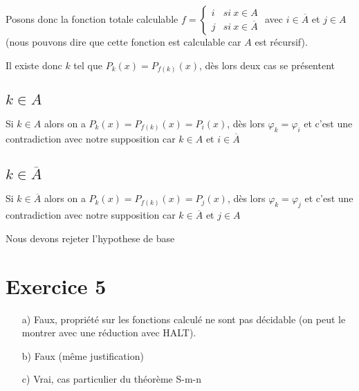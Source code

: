 \documentclass[a4paper,onecolumn,11pt]{article}
\begin{document}
Posons donc la fonction totale calculable $f =
\left\{
\begin{array}{ll}
i & si\ x \in A\\
j & si\ x \in \overline{A}
\end{array}
\right.
$ avec $i \in \overline{A}$ et $j \in A$ (nous pouvons dire que cette fonction est calculable car $A$ est récursif).

Il existe donc $k$ tel que $P_k(x) = P_{f(k)}(x)$, dès lors deux cas se présentent
\subsection*{$k \in A$}

Si $k \in A$ alors on a $P_k(x) = P_{f(k)}(x) = P_i(x)$, dès lors $\varphi_k = \varphi_i$ et c'est une contradiction avec notre supposition car $k \in A$ et $i\in \overline{A}$

\subsection*{$k \in \overline{A}$}

Si $k \in \overline{A}$ alors on a $P_k(x) = P_{f(k)}(x) = P_j(x)$, dès lors $\varphi_k = \varphi_j$ et c'est une contradiction avec notre supposition car $k \in \overline{A}$ et $j\in A$

Nous devons rejeter l'hypothese de base

\section*{Exercice 5}

\begin{itemize}
	\item[a)] Faux, propriété sur les fonctions calculé ne sont pas décidable (on peut le montrer avec une réduction avec HALT).
	\item[b)] Faux (même justification)
	\item[c)] Vrai, cas particulier du théorème S-m-n
\end{itemize}
\end{document}
